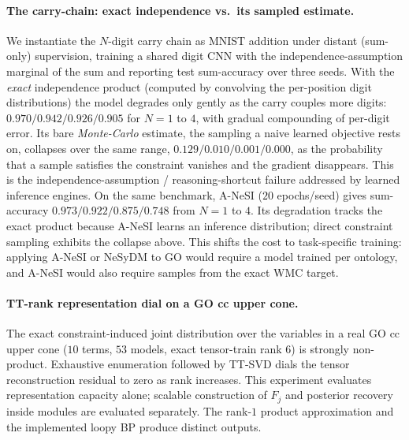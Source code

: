 \documentclass[letterpaper]{article}
\newcommand{\WMC}{\ensuremath{\mathrm{WMC}}}
\begin{document}
\paragraph{The carry-chain: exact independence vs.\ its sampled estimate.}
We instantiate the $N$-digit carry chain as MNIST addition under distant (sum-only) supervision,
training a shared digit CNN with the independence-assumption marginal of the sum and reporting
test sum-accuracy over three seeds. With the \emph{exact} independence product (computed by
convolving the per-position digit distributions) the model degrades only gently as the carry
couples more digits: $0.970/0.942/0.926/0.905$ for $N{=}1$ to $4$, with gradual compounding
of per-digit error. Its bare \emph{Monte-Carlo} estimate, the sampling a naive
learned objective rests on, collapses over the same range, $0.129/0.010/0.001/0.000$,
as the probability that a sample satisfies the constraint vanishes and the gradient disappears.
This is the independence-assumption / reasoning-shortcut failure
\citep{vankrieken2024independence,marconato2023reasoningshortcuts} addressed by learned inference
engines. On the same benchmark, A-NeSI ($20$ epochs/seed) gives sum-accuracy
$0.973/0.922/0.875/0.748$ from $N{=}1$ to $4$. Its degradation tracks the exact product because A-NeSI learns an inference distribution; direct constraint sampling exhibits the collapse above. This shifts the cost to task-specific training: applying A-NeSI or NeSyDM
\citep{vankrieken2025nesydm} to GO would require a model trained per ontology, and A-NeSI would
also require samples from the exact $\WMC$ target.

\paragraph{TT-rank representation dial on a GO cc upper cone.}
The exact constraint-induced joint distribution over the variables in a real GO cc upper cone ($10$ terms, $53$ models, exact tensor-train rank $6$) is strongly non-product. Exhaustive enumeration followed by TT-SVD dials the tensor reconstruction residual to zero as rank increases. This experiment evaluates representation capacity alone; scalable construction of \(F_j\) and posterior recovery inside modules are evaluated separately. The rank-$1$ product approximation and the implemented loopy BP produce distinct outputs.
\end{document}
